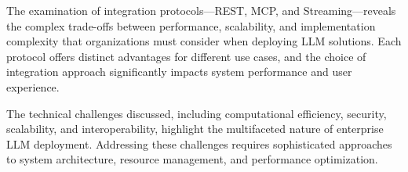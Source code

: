 %
%

The examination of integration protocols—REST, MCP, and Streaming—reveals the complex trade-offs between performance, scalability, and implementation complexity that organizations must consider when deploying LLM solutions. Each protocol offers distinct advantages for different use cases, and the choice of integration approach significantly impacts system performance and user experience.

The technical challenges discussed, including computational efficiency, security, scalability, and interoperability, highlight the multifaceted nature of enterprise LLM deployment. Addressing these challenges requires sophisticated approaches to system architecture, resource management, and performance optimization.

